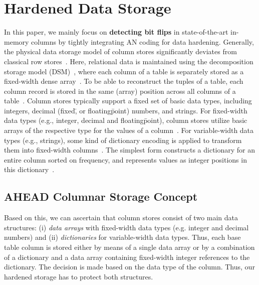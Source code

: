 \section{Hardened Data Storage}
\label{sec:DataHardening}

In this paper, we mainly focus on \textbf{detecting bit flips} in state-of-the-art in-memory columns by tightly integrating AN coding for data hardening. Generally, the physical data storage model of column stores significantly deviates from classical row stores~\cite{DBLP:conf/sigmod/DiaconuFILMSVZ13,DBLP:journals/debu/IdreosGNMMK12,DBLP:journals/debu/LahiriNF13,DBLP:conf/vldb/StonebrakerABCCFLLMOORTZ05,DBLP:conf/icde/ZukowskiWB12}. Here, relational data is maintained using the decomposition storage model (DSM)~\cite{DBLP:conf/sigmod/CopelandK85}, where each column of a table is separately stored as a fixed-width dense array~\cite{DBLP:journals/ftdb/AbadiBHIM13}. To be able to reconstruct the tuples of a table, each column record is stored in the same (array) position across all columns of a table~\cite{DBLP:journals/ftdb/AbadiBHIM13}. Column stores typically support a fixed set of basic data types, including integers, decimal (fixed\=, or floating\=point) numbers, and strings. For fixed-width data types (e.g., integer, decimal and floating\=point), column stores utilize basic arrays of the respective type for the values of a column~\cite{DBLP:journals/ftdb/AbadiBHIM13,DBLP:journals/debu/IdreosGNMMK12}. For variable-width data types (e.g., strings), some kind of dictionary encoding is applied to transform them into fixed-width columns~\cite{DBLP:conf/sigmod/AbadiMF06,DBLP:journals/ftdb/AbadiBHIM13,DBLP:conf/sigmod/BinnigHF09}. The simplest form constructs a dictionary for an entire column sorted on frequency, and represents values as integer positions in this dictionary~\cite{DBLP:journals/ftdb/AbadiBHIM13}.


\subsection{AHEAD Columnar Storage Concept}
\label{sec:StorageConcept}

Based on this, we can ascertain that column stores consist of two main data structures: (i) \emph{data arrays} with fixed-width data types (e.g. integer and decimal numbers) and (ii) \emph{dictionaries} for variable-width data types. Thus, each base table column is stored either by means of a single data array or by a combination of a dictionary and a data array containing fixed-width integer references to the dictionary. The decision is made based on the data type of the column. Thus, our hardened storage has to protect both structures.

